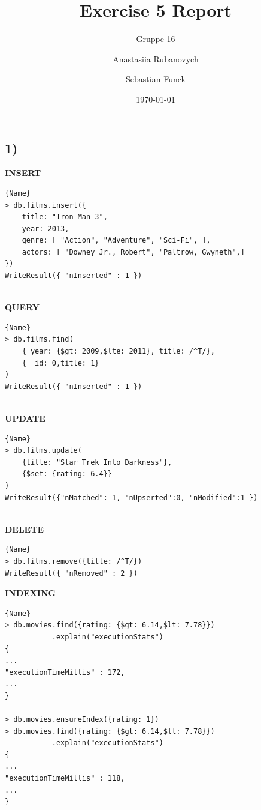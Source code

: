 \documentclass[a4paper,english,abstract=on]{scrartcl}
\title{Exercise 5 Report}
\subtitle{Gruppe 16}
\author{Anastasiia Rubanovych\and Sebastian Funck}
\date{\today}
\begin{document}
\maketitle

\subsection*{1)}
\textbf{INSERT}
\begin{lstlisting}{Name}
> db.films.insert({ 
	title: "Iron Man 3", 
	year: 2013, 
	genre: [ "Action", "Adventure", "Sci-Fi", ], 
	actors: [ "Downey Jr., Robert", "Paltrow, Gwyneth",]
})
WriteResult({ "nInserted" : 1 })
\end{lstlisting}
~\\
\textbf{QUERY}
\begin{lstlisting}{Name}
> db.films.find(
	{ year: {$gt: 2009,$lte: 2011}, title: /^T/},
	{ _id: 0,title: 1}
)
WriteResult({ "nInserted" : 1 })
\end{lstlisting}
~\\
\textbf{UPDATE}
\begin{lstlisting}{Name}
> db.films.update(
	{title: "Star Trek Into Darkness"},
	{$set: {rating: 6.4}}
)
WriteResult({"nMatched": 1, "nUpserted":0, "nModified":1 })
\end{lstlisting}
~\\
\textbf{DELETE}
\begin{lstlisting}{Name}
> db.films.remove({title: /^T/})
WriteResult({ "nRemoved" : 2 })
\end{lstlisting}

\newpage
\textbf{INDEXING}
\begin{lstlisting}{Name}
> db.movies.find({rating: {$gt: 6.14,$lt: 7.78}})
           .explain("executionStats")
{
...
"executionTimeMillis" : 172,
...
}

> db.movies.ensureIndex({rating: 1})
> db.movies.find({rating: {$gt: 6.14,$lt: 7.78}})
           .explain("executionStats")
{
...
"executionTimeMillis" : 118,
...
}
\end{lstlisting}
\end{document}
